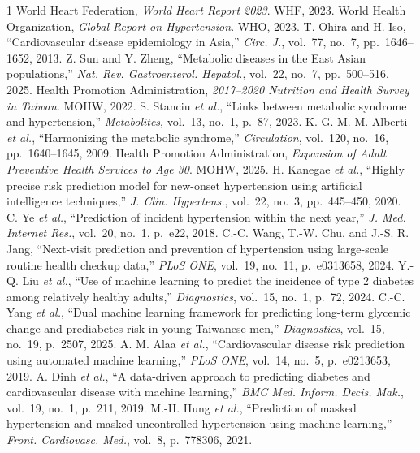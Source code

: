 \documentclass[journal]{IEEEtran}
\begin{document}
\begin{thebibliography}{1}
 World Heart Federation, \emph{World Heart Report 2023}. WHF, 2023.
 World Health Organization, \emph{Global Report on Hypertension}. WHO, 2023.
 T. Ohira and H. Iso, ``Cardiovascular disease epidemiology in Asia,'' \emph{Circ. J.}, vol.~77, no.~7, pp.~1646--1652, 2013.
 Z. Sun and Y. Zheng, ``Metabolic diseases in the East Asian populations,'' \emph{Nat. Rev. Gastroenterol. Hepatol.}, vol.~22, no.~7, pp.~500--516, 2025.
 Health Promotion Administration, \emph{2017--2020 Nutrition and Health Survey in Taiwan}. MOHW, 2022.
 S. Stanciu \textit{et al.}, ``Links between metabolic syndrome and hypertension,'' \emph{Metabolites}, vol.~13, no.~1, p.~87, 2023.
 K. G. M. M. Alberti \textit{et al.}, ``Harmonizing the metabolic syndrome,'' \emph{Circulation}, vol.~120, no.~16, pp.~1640--1645, 2009.
 Health Promotion Administration, \emph{Expansion of Adult Preventive Health Services to Age 30}. MOHW, 2025.
 H. Kanegae \textit{et al.}, ``Highly precise risk prediction model for new-onset hypertension using artificial intelligence techniques,'' \emph{J. Clin. Hypertens.}, vol.~22, no.~3, pp.~445--450, 2020.
 C. Ye \textit{et al.}, ``Prediction of incident hypertension within the next year,'' \emph{J. Med. Internet Res.}, vol.~20, no.~1, p.~e22, 2018.
 C.-C. Wang, T.-W. Chu, and J.-S. R. Jang, ``Next-visit prediction and prevention of hypertension using large-scale routine health checkup data,'' \emph{PLoS ONE}, vol.~19, no.~11, p.~e0313658, 2024.
 Y.-Q. Liu \textit{et al.}, ``Use of machine learning to predict the incidence of type 2 diabetes among relatively healthy adults,'' \emph{Diagnostics}, vol.~15, no.~1, p.~72, 2024.
 C.-C. Yang \textit{et al.}, ``Dual machine learning framework for predicting long-term glycemic change and prediabetes risk in young Taiwanese men,'' \emph{Diagnostics}, vol.~15, no.~19, p.~2507, 2025.
 A. M. Alaa \textit{et al.}, ``Cardiovascular disease risk prediction using automated machine learning,'' \emph{PLoS ONE}, vol.~14, no.~5, p.~e0213653, 2019.
 A. Dinh \textit{et al.}, ``A data-driven approach to predicting diabetes and cardiovascular disease with machine learning,'' \emph{BMC Med. Inform. Decis. Mak.}, vol.~19, no.~1, p.~211, 2019.
 M.-H. Hung \textit{et al.}, ``Prediction of masked hypertension and masked uncontrolled hypertension using machine learning,'' \emph{Front. Cardiovasc. Med.}, vol.~8, p.~778306, 2021.

\end{thebibliography}
\end{document}
